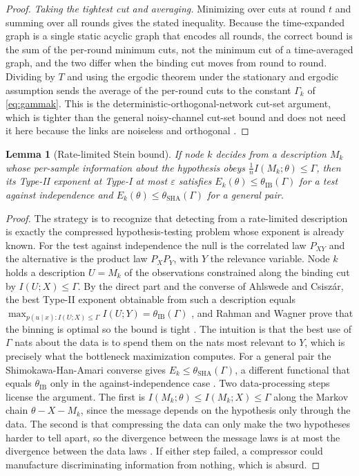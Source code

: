\documentclass[journal]{IEEEtran}
\newtheorem{lemma}{Lemma}
\theoremstyle{definition}
\theoremstyle{remark}
\newcommand{\tib}{\theta_{\mathrm{IB}}}
\newcommand{\tsha}{\theta_{\mathrm{SHA}}}
\newcommand{\Gk}{\Gamma_k}
\begin{document}
\begin{proof}
\emph{Taking the tightest cut and averaging.} Minimizing over cuts at round $t$ and summing over all rounds gives
the stated inequality. Because the time-expanded graph is a single static acyclic graph that encodes all rounds,
the correct bound is the sum of the per-round minimum cuts, not the minimum cut of a time-averaged graph, and the
two differ when the binding cut moves from round to round. Dividing by $T$ and using the ergodic theorem under the
stationary and ergodic assumption sends the average of the per-round cuts to the constant $\Gk$ of
\eqref{eq:gammak}. This is the deterministic-orthogonal-network cut-set argument, which is tighter than the
general noisy-channel cut-set bound and does not need it here because the links are noiseless and orthogonal
\cite{elgamalkim2011,aclY2000}.
\end{proof}

\begin{lemma}[Rate-limited Stein bound]\label{lem:stein}
If node $k$ decides from a description $M_k$ whose per-sample information about the hypothesis obeys
$\tfrac1n I(M_k;\theta)\le\Gamma$, then its Type-II exponent at Type-I at most $\varepsilon$ satisfies
$E_k(\theta)\le\tib(\Gamma)$ for a test against independence and $E_k(\theta)\le\tsha(\Gamma)$ for a general pair.
\end{lemma}

\begin{proof}
The strategy is to recognize that detecting from a rate-limited description is exactly the compressed
hypothesis-testing problem whose exponent is already known. For the test against independence the null is the
correlated law $P_{XY}$ and the alternative is the product law $P_XP_Y$, with $Y$ the relevance variable. Node $k$
holds a description $U=M_k$ of the observations constrained along the binding cut by $I(U;X)\le\Gamma$. By the
direct part and the converse of Ahlswede and Csisz\'ar, the best Type-II exponent obtainable from such a
description equals $\max_{p(u\mid x):I(U;X)\le\Gamma} I(U;Y)=\tib(\Gamma)$ \cite{ahlswedecsiszar1986}, and Rahman
and Wagner prove that the binning is optimal so the bound is tight \cite{rahmanwagner2012}. The intuition is that
the best use of $\Gamma$ nats about the data is to spend them on the nats most relevant to $Y$, which is precisely
what the bottleneck maximization computes. For a general pair the Shimokawa-Han-Amari converse gives
$E_k\le\tsha(\Gamma)$, a different functional that equals $\tib$ only in the against-independence case
\cite{sha1994,han1987}. Two data-processing steps license the argument. The first is $I(M_k;\theta)\le
I(M_k;X)\le\Gamma$ along the Markov chain $\theta\!-\!X\!-\!M_k$, since the message depends on the hypothesis only
through the data. The second is that compressing the data can only make the two hypotheses harder to tell apart,
so the divergence between the message laws is at most the divergence between the data laws \cite{coverthomas2006,%
csiszarkorner2011}. If either step failed, a compressor could manufacture discriminating information from nothing,
which is absurd.
\end{proof}
\end{document}
